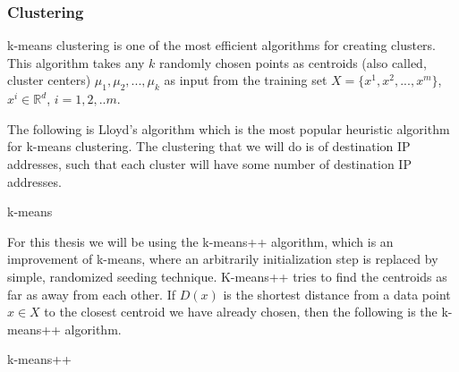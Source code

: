 \documentclass[12pt,oneside,a4paper]{article}
\begin{document}
\subsubsection{Clustering} \label{subsec:Clustering}

k-means\cite{k-means-clustering} clustering is one of the most efficient algorithms for creating clusters. This algorithm takes any $k$ randomly chosen points as centroids (also called, cluster centers) $\mu_{1}, \mu_{2}, ..., \mu_{k}$ as input from the training set $X = \{x^{1}, x^{2}, ..., x^{m}\}$, $x^{i} \in \mathbb{R}^d$, $i= {1,2, ..m}$.

The following is Lloyd's algorithm which is the most popular heuristic algorithm for k-means clustering. The clustering that we will do is of destination IP addresses, such that each cluster will have some number of destination IP addresses.

\begin{algorithm}[H]
\caption{k-means}\label{k-means}
\begin{algorithmic}[1]
  \Repeat
\end{algorithmic}
\end{algorithm}

For this thesis we will be using the k-means++ algorithm, which is an improvement of k-means, where an arbitrarily initialization step is replaced by simple, randomized seeding technique. K-means++ tries to find the centroids as far as away from each other. If $D(x)$ is the shortest distance from a data point $x \in X$ to the closest centroid we have already chosen, then the following is the k-means++ algorithm\cite{k-means++}.

\begin{algorithm}[H]
\caption{k-means++}\label{k-means++}
\begin{algorithmic}[1]
\end{algorithmic}
\end{algorithm}
\end{document}
